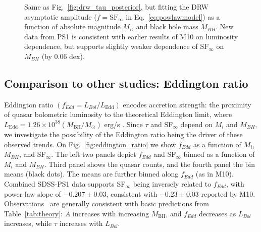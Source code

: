 \documentclass[twocolumn]{aastex62}
\begin{document}
\begin{figure*}
\caption{Same as Fig.~\ref{fig:drw_tau_posterior}, but fitting the DRW asymptotic amplitude ($f = \mathrm{SF}_{\infty}$ in Eq.~\ref{eq:powlawmodel})  as a function of absolute magnitude $M_{i}$, and black hole mass $M_{BH}$. New data from PS1 is consistent with earlier results of M10 on luminosity dependence, but supports slightly weaker dependence of $\mathrm{SF}_{\infty}$ on $M_{BH}$ (by 0.06 dex).}
\label{fig:drw_sf_posterior}
\end{figure*} 

 

\subsection{Comparison to other studies: Eddington ratio}

Eddington ratio $(f_{Edd} {=} L_{Bol}/L_{\mathrm{Edd}})$ encodes accretion strength: the proximity of quasar bolometric luminosity to the theoretical Eddington limit, where $L_{\mathrm{Edd}} {=} 1.26 {\times} 10^{38} (M_{\mathrm{BH}} / M_{\odot})$ erg/s \citep{shen2011}. Since $\tau$ and SF$_{\infty}$ depend on $M_{i}$ and $M_{BH}$, we investigate the possibility of the Eddington ratio being the driver of these observed trends. On Fig.~\ref{fig:eddington_ratio} we show $f_{Edd} $ as a function of $M_{i}$, $M_{BH}$, and SF$_{\infty}$. The left two panels depict  $f_{Edd} $ and SF$_{\infty}$ binned as a function of $M_{i}$ and $M_{BH}$. Third panel shows the quasar counts, and the fourth panel the bin means (black dots). The means are further binned along  $f_{Edd} $ (as in M10). Combined SDSS-PS1 data supports SF$_{\infty}$  being inversely related to  $f_{Edd} $, with power-law slope of $-0.207 \pm 0.03$, consistent with  $-0.23 \pm 0.03$ reported by M10. Observations \ are generally consistent with basic predictions from Table~\ref{tab:theory}: $A$ increases with increasing  $M_{\mathrm{BH}}$, and  $f_{Edd} $ decreases as $L_{Bol}$ increases, while $\tau$ increases with  $L_{Bol}$. 
\end{document}
